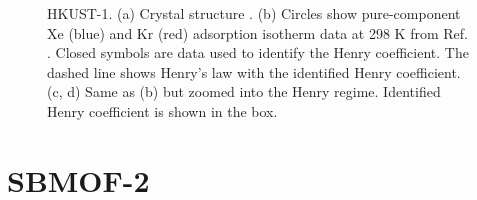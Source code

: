     \begin{figure}[h!]
       \centering
  
       
       \caption{HKUST-1. (a) Crystal structure \cite{HKUST-1_structure}.
       (b) Circles show pure-component Xe (blue) and Kr (red) adsorption isotherm data at 298 K from Ref. \cite{HKUST-1_XeKr}. 
       Closed symbols are data used to identify the Henry coefficient. The dashed line shows Henry's law with the identified Henry coefficient.
       (c, d) Same as (b) but zoomed into the Henry regime. Identified Henry coefficient is shown in the box.}
    \end{figure}
    
    \clearpage
    
    
    \section{SBMOF-2}
    
